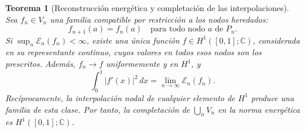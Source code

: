 \documentclass[a4paper,10pt]{article}
\newtheorem{theorem}{Teorema}[section]
\theoremstyle{definition}\newtheorem{definition}[theorem]{Definición}
\theoremstyle{remark}\newtheorem{remark}[theorem]{Observación}
\numberwithin{equation}{section}
\begin{document}
\begin{theorem}[Reconstrucción energética y completación de las interpolaciones]
\label{thm:limite-energia-h1-k}
Sea \(f_n\in V_n\) una familia compatible por restricción a los
nodos heredados:
\[
 f_{n+1}(a)=f_n(a)
 \quad\text{para todo nodo }a\text{ de }P_n.
\]
Si \(\sup_n\mathcal E_n(f_n)<\infty\), existe una única función
\(f\in H^1([0,1];\mathbb C)\), considerada en su representante
continuo, cuyos valores en todos esos nodos son los prescritos. Además,
\(f_n\to f\) uniformemente y en \(H^1\), y
\begin{equation}
 \int_0^1|f'(x)|^2\,dx
 =\lim_{n\to\infty}\mathcal E_n(f_n).
 \label{eq:limite-energia-h1-k}
\end{equation}
Recíprocamente, la interpolación nodal de cualquier elemento de \(H^1\)
produce una familia de esta clase. Por tanto, la completación de
\(\bigcup_n V_n\) en la norma energética es \(H^1([0,1];\mathbb C)\).
\end{theorem}
\end{document}
